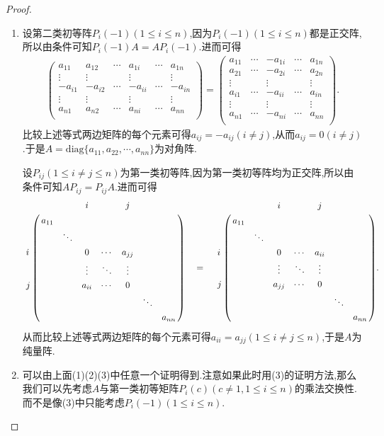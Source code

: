 \documentclass[../../main.tex]{subfiles}
\begin{document}
\begin{proof}
\begin{enumerate}
\item 设第二类初等阵\(P_{i}(-1)(1\leq i\leq n)\),因为$P_{i}(-1)(1\leq i\leq n)$都是正交阵,所以由条件可知$P_{i}(-1)A=AP_{i}(-1)$.进而可得
\begin{align*}
\left( \begin{matrix}
a_{11}&		a_{12}&		\cdots&		a_{1i}&		\cdots&		a_{1n}\\
\vdots&		\vdots&		&		\vdots&		&		\vdots\\
-a_{i1}&		-a_{i2}&		\cdots&		-a_{ii}&		\cdots&		-a_{in}\\
\vdots&		\vdots&		&		\vdots&		&		\vdots\\
a_{n1}&		a_{n2}&		\cdots&		a_{ni}&		\cdots&		a_{nn}\\
\end{matrix} \right) =\left( \begin{matrix}
a_{11}&		\cdots&		-a_{1i}&		\cdots&		a_{1n}\\
a_{21}&		\cdots&		-a_{2i}&		\cdots&		a_{2n}\\
\vdots&		&		\vdots&		&		\vdots\\
a_{i1}&		\cdots&		-a_{ii}&		\cdots&		a_{in}\\
\vdots&		&		\vdots&		&		\vdots\\
a_{n1}&		\cdots&		-a_{ni}&		\cdots&		a_{nn}\\
\end{matrix} \right) .
\end{align*}
比较上述等式两边矩阵的每个元素可得$a_{ij}=-a_{ij}\left( i\ne j \right) $,从而$a_{ij}=0\left( i\ne j \right) $.于是\(A=\text{diag}\{a_{11},a_{22},\cdots,a_{nn}\}\)为对角阵.

设\(P_{ij}(1\leq i\neq j\leq n)\)为第一类初等阵,因为第一类初等阵均为正交阵,所以由条件可知\(AP_{ij}=P_{ij}A\).进而可得
\begin{align*}
\bordermatrix{%
&    &		&		i&		&		j&		&		\cr
&    a_{11}&		&		&		&		&		&		\cr
&    &		\ddots&		&		&		&		&		\cr
i&    &		&		0&		\cdots&		a_{jj}&		&		\cr
&   &		&		\vdots&		\ddots&		\vdots&		&		\cr
j&    &		&		a_{ii}&		\cdots&		0&		&		\cr
&    &		&		&		&		&		\ddots&		\cr
&    &		&		&		&		&		&		a_{nn}\cr
} \quad =\quad \bordermatrix{%
&    &		&		i&		&		j&		&		\cr
&    a_{11}&		&		&		&		&		&		\cr
&    &		\ddots&		&		&		&		&		\cr
i&    &		&		0&		\cdots&		a_{ii}&		&		\cr
&    &		&		\vdots&		\ddots&		\vdots&		&		\cr
j&   &		&		a_{jj}&		\cdots&		0&		&		\cr
&    &		&		&		&		&		\ddots&		\cr
&    &		&		&		&		&		&		a_{nn}\cr
} .
\end{align*}
从而比较上述等式两边矩阵的每个元素可得\(a_{ii}=a_{jj}(1\leq i\neq j\leq n)\),于是\(A\)为纯量阵.

\item 可以由上面(1)(2)(3)中任意一个证明得到.注意如果此时用(3)的证明方法,那么我们可以先考虑$A$与第一类初等矩阵\(P_{i}(c)(c\ne 1,1\leq i\leq n)\)的乘法交换性.而不是像(3)中只能考虑\(P_{i}(-1)(1\leq i\leq n)\).
\end{enumerate}
\end{proof}
\end{document}
